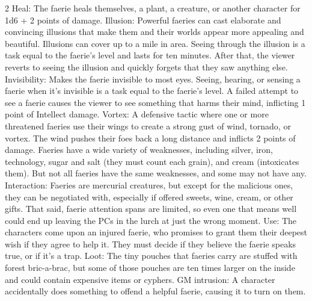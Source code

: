 \begin{multicols}{2}
Heal: The faerie heals themselves, a plant, a creature, or another character for 1d6 + 2 points of damage.
Illusion: Powerful faeries can cast elaborate and convincing illusions that make them and their worlds appear more appealing and beautiful. Illusions can cover up to a mile in area. Seeing through the illusion is a task equal to the faerie’s level and lasts for ten minutes. After that, the viewer reverts to seeing the illusion and quickly forgets that they saw anything else.
Invisibility: Makes the faerie invisible to most eyes. Seeing, hearing, or sensing a faerie when it’s invisible is a task equal to the faerie’s level. A failed attempt to see a faerie causes the viewer to see something that harms their mind, inflicting 1 point of Intellect damage.
Vortex: A defensive tactic where one or more threatened faeries use their wings to create a strong gust of wind, tornado, or vortex. The wind pushes their foes back a long distance and inflicts 2 points of damage.
Faeries have a wide variety of weaknesses, including silver, iron, technology, sugar and salt (they must count each grain), and cream (intoxicates them). But not all faeries have the same weaknesses, and some may not have any.
Interaction: Faeries are mercurial creatures, but except for the malicious ones, they can be negotiated with, especially if offered sweets, wine, cream, or other gifts. That said, faerie attention spans are limited, so even one that means well could end up leaving the PCs in the lurch at just the wrong moment.
Use: The characters come upon an injured faerie, who promises to grant them their deepest wish if they agree to help it. They must decide if they believe the faerie speaks true, or if it’s a trap.
Loot: The tiny pouches that faeries carry are stuffed with forest bric-a-brac, but some of those pouches are ten times larger on the inside and could contain expensive items or cyphers.
GM intrusion: A character accidentally does something to offend a helpful faerie, causing it to turn on them.


\end{multicols}
